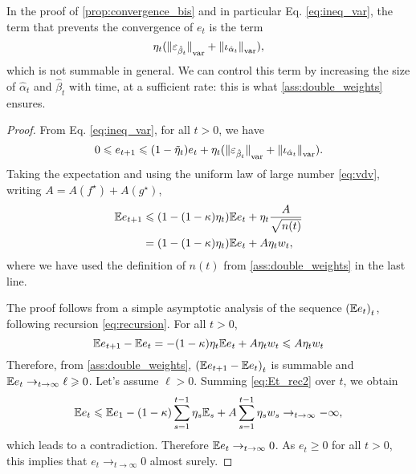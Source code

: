 In the proof of \autoref{prop:convergence_bis} and in particular Eq. \eqref{eq:ineq_var}, the term that prevents the convergence of $e_t$ is the term
\begin{equation}
    \eta_t ({\Vert \varepsilon_{\hat \beta_t} \Vert}_{\text{\upshape var}} + 
    {\Vert \iota_{\hat \alpha_t} \Vert}_{\text{\upshape var}}),
\end{equation}
which is not summable in general. We can control this term by increasing the
 size of $\hat \alpha_t$ and $\hat \beta_t$ with time, at a sufficient rate: this is what \autoref{ass:double_weights} ensures.

\begin{proof}
From Eq. \eqref{eq:ineq_var}, for all $t > 0$, we have
\begin{equation}\label{eq:Et_rec}
    0 \leqslant e_{t+1} \leqslant 
    (1 - \tilde \eta_t) e_t
    + \eta_t
    ({\Vert \varepsilon_{\hat \beta_t} \Vert}_{\text{\upshape var}} + 
    {\Vert \iota_{\hat \alpha_t} \Vert}_{\text{\upshape var}}).
\end{equation}
Taking the expectation and using the uniform law of 
large number \eqref{eq:vdv}, writing $A = A(f^\star) + A(g^\star)$,
\begin{align}\label{eq:recursion}
    \mathbb{E} e_{t+1} &\leqslant (1 - (1 - \kappa) \eta_t) \mathbb{E} e_t + 
    \eta_t \frac{A}{\sqrt{n(t)}} \\
    &= (1 - (1 - \kappa) \eta_t) \mathbb{E} e_t + 
    A \eta_t w_t,
\end{align}
where we have used the definition of $n(t)$ from \autoref{ass:double_weights} in the last line.

The proof follows from a simple asymptotic analysis of the sequence ${(\mathbb{E} e_t)}_t$, following recursion \eqref{eq:recursion}.
For all $t > 0$, 
\begin{equation}\label{eq:Et_rec2}
    \mathbb{E} e_{t+1} - \mathbb{E} e_t = - (1 - \kappa) \eta_t \mathbb{E} e_t + A \eta_t w_t
     \leqslant A \eta_t w_t
\end{equation}
Therefore, from \autoref{ass:double_weights}, ${(\mathbb{E} e_{t+1} - \mathbb{E} e_t)}_t$ is
summable and $\mathbb{E} e_t \to_{t \to \infty} \ell \geqslant 0$. Let's assume $\ell > 0$.
Summing \eqref{eq:Et_rec2} over $t$, we obtain
\begin{equation}
    \mathbb{E} e_t \leqslant \mathbb{E} e_1 - (1 - \kappa) \sum_{s=1}^{t-1} \eta_s \mathbb{E}_s 
    + A \sum_{s=1}^{t-1} \eta_s w_s \to_{t \to \infty} - \infty,
\end{equation}
which leads to a contradiction. Therefore $\mathbb{E} e_t \to_{t \to \infty} 0$. As
$e_t \geq 0$ for all $t > 0$, this implies that $e_t \to_{t \to \infty} 0$
almost surely.
\end{proof}


